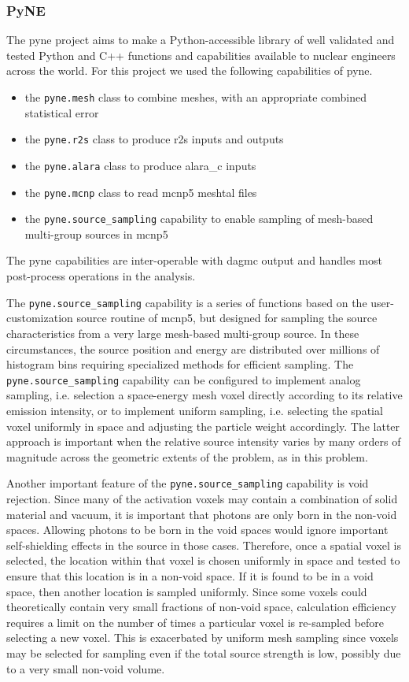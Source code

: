 \documentclass[12pt]{article}
\begin{document}
\subsubsection{PyNE}
The \gls{pyne} \cite{Scopatz2012b} project aims to
make a Python-accessible library of well validated and tested
Python and C++ functions and capabilities available to nuclear engineers 
across the world.
For this project we used the following capabilities of \gls{pyne}.
\begin{itemize}
  \item{the \texttt{pyne.mesh} class to combine meshes, with an appropriate
        combined statistical error}
  \item{the \texttt{pyne.r2s} class to produce \gls{r2s} inputs and outputs}
  \item{the \texttt{pyne.alara} class to produce \gls{alara_c} inputs}
  \item{the \texttt{pyne.mcnp} class to read \gls{mcnp5} meshtal files}
  \item{the \texttt{pyne.source\_sampling} capability to enable sampling of 
        mesh-based multi-group sources in \gls{mcnp5} }
\end{itemize}
The \gls{pyne} capabilities are inter-operable with \gls{dagmc} output and handles
most post-process operations in the analysis.

The \texttt{pyne.source\_sampling} capability is a series of functions based on
the user-customization source routine of \gls{mcnp5}, but designed for sampling
the source characteristics from a very large mesh-based multi-group source.  In
these circumstances, the source position and energy are distributed over millions
of histogram bins requiring specialized methods for efficient sampling.  The
\texttt{pyne.source\_sampling} capability can be configured to implement analog
sampling, i.e. selection a space-energy mesh voxel directly according to its
relative emission intensity, or to implement uniform sampling, i.e. selecting the
spatial voxel uniformly in space and adjusting the particle weight accordingly.
The latter approach is important when the relative source intensity varies by
many orders of magnitude across the geometric extents of the problem, as in 
this problem.

Another important feature of the \texttt{pyne.source\_sampling} capability is
void rejection.  Since many of the activation voxels may contain a combination
of solid material and vacuum, it is important that photons are only born in the
non-void spaces.  Allowing photons to be born in the void spaces would ignore
important self-shielding effects in the source in those cases.  Therefore,
once a spatial voxel is selected, the location within that voxel is chosen
uniformly in space and tested to ensure that this location is in a non-void
space.  If it is found to be in a void space, then another location is sampled
uniformly.  Since some voxels could theoretically contain very small fractions
of non-void space, calculation efficiency requires a limit on the number of
times a particular voxel is re-sampled before selecting a new voxel.  This is
exacerbated by uniform mesh sampling since voxels may be selected for sampling
even if the total source strength is low, possibly due to a very small
non-void volume.
\end{document}
